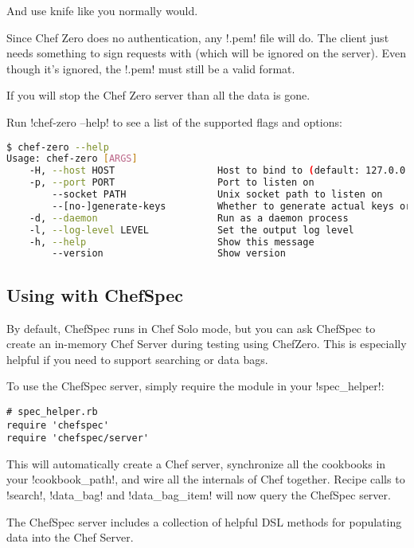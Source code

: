And use knife like you normally would.

Since Chef Zero does no authentication, any \inline!.pem! file will do. The client just needs something to sign requests with (which will be ignored on the server). Even though it's ignored, the \inline!.pem! must still be a valid format.

If you will stop the Chef Zero server than all the data is gone.

Run \inline!chef-zero --help! to see a list of the supported flags and options:

\begin{lstlisting}[language=Bash,label=lst:testing-chef-zero4]
$ chef-zero --help
Usage: chef-zero [ARGS]
    -H, --host HOST                  Host to bind to (default: 127.0.0.1)
    -p, --port PORT                  Port to listen on
        --socket PATH                Unix socket path to listen on
        --[no-]generate-keys         Whether to generate actual keys or fake it (faster).  Default: false.
    -d, --daemon                     Run as a daemon process
    -l, --log-level LEVEL            Set the output log level
    -h, --help                       Show this message
        --version                    Show version
\end{lstlisting}


\subsection{Using with ChefSpec}

By default, ChefSpec runs in Chef Solo mode, but you can ask ChefSpec to create an in-memory Chef Server during testing using ChefZero. This is especially helpful if you need to support searching or data bags.

To use the ChefSpec server, simply require the module in your \inline!spec_helper!:

\begin{lstlisting}[label=lst:testing-chef-zero5]
# spec_helper.rb
require 'chefspec'
require 'chefspec/server'
\end{lstlisting}

This will automatically create a Chef server, synchronize all the cookbooks in your \inline!cookbook_path!, and wire all the internals of Chef together. Recipe calls to \inline!search!, \inline!data_bag! and \inline!data_bag_item! will now query the ChefSpec server.

The ChefSpec server includes a collection of helpful DSL methods for populating data into the Chef Server.

